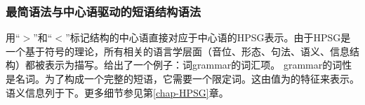\subsubsection{最简语法与中心语驱动的短语结构语法}
\label{sec-minimalism-atb-extraction}

用“$>$”和“$<$”标记结构的中心语直接对应于中心语的HPSG表示。由于HPSG是一个基于符号的理论，所有相关的语言学层面（音位、形态、句法、语义、信息结构）都被表示为描写。给出了一个例子：词grammar的词汇项。
\ea 
{}
\z
grammar的词性是名词。为了构成一个完整的短语，它需要一个限定词。这由值为的\sprc 特征来表示。语义信息列于\contc 下。更多细节参见第\ref{chap-HPSG}章。

